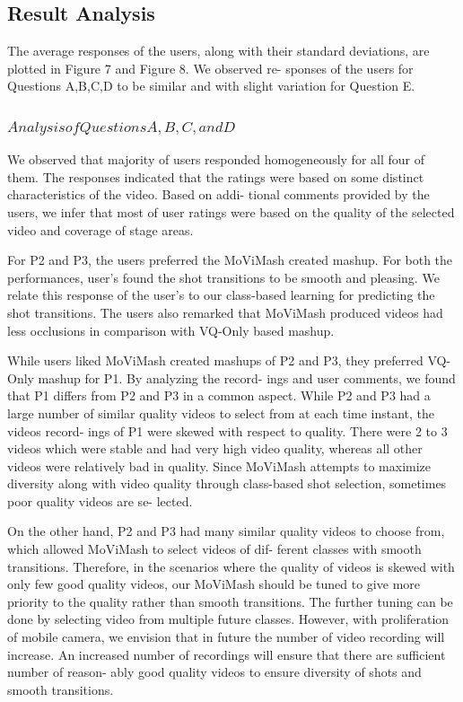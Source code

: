 \documentclass{clsfile}
\begin{document}
\subsection{Result Analysis}
The average responses of the users, along with their standard
deviations, are plotted in Figure 7 and Figure 8. We observed re-
sponses of the users for Questions A,B,C,D to be similar and with
slight variation for Question E.

\subsubsection{$Analysis of Questions A, B, C, and D$}
We observed that majority of users responded homogeneously
for all four of them. The responses indicated that the ratings were
based on some distinct characteristics of the video. Based on addi-
tional comments provided by the users, we infer that most of user
ratings were based on the quality of the selected video and coverage
of stage areas.


For P2 and P3, the users preferred the MoViMash created mashup.
For both the performances, user’s found the shot transitions to be
smooth and pleasing. We relate this response of the user’s to our
class-based learning for predicting the shot transitions. The users
also remarked that MoViMash produced videos had less occlusions
in comparison with VQ-Only based mashup.

While users liked MoViMash created mashups of P2 and P3,
they preferred VQ-Only mashup for P1. By analyzing the record-
ings and user comments, we found that P1 differs from P2 and P3 in
a common aspect. While P2 and P3 had a large number of similar
quality videos to select from at each time instant, the videos record-
ings of P1 were skewed with respect to quality. There were 2 to 3
videos which were stable and had very high video quality, whereas
all other videos were relatively bad in quality. Since MoViMash
attempts to maximize diversity along with video quality through
class-based shot selection, sometimes poor quality videos are se-
lected.

On the other hand, P2 and P3 had many similar quality videos
to choose from, which allowed MoViMash to select videos of dif-
ferent classes with smooth transitions. Therefore, in the scenarios
where the quality of videos is skewed with only few good quality
videos, our MoViMash should be tuned to give more priority to
the quality rather than smooth transitions. The further tuning can
be done by selecting video from multiple future classes. However,
with proliferation of mobile camera, we envision that in future the
number of video recording will increase. An increased number of
recordings will ensure that there are sufficient number of reason-
ably good quality videos to ensure diversity of shots and smooth
transitions.
\end{document}
